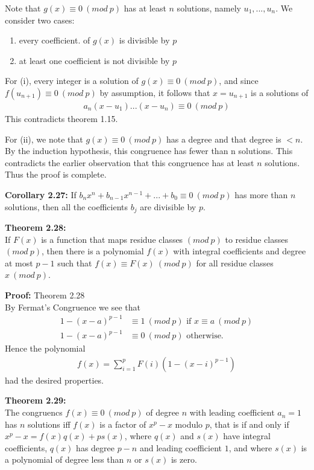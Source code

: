 \documentclass[a4paper]{article}
\begin{document}
Note that $g(x)\equiv 0\ (mod\ p)$ has at least $n$ solutions, namely $u_1,...,u_n$. We consider two cases:

\renewcommand{\theenumi}{\roman{enumi}}
\begin{enumerate}
    \item every coefficient. of $g(x)$ is divisible by $p$
    \item at least one coefficient is not divisible by $p$
\end{enumerate}

For (i), every integer is a solution of $g(x)\equiv 0\ (mod\ p)$, and since $f(u_{n+1})\equiv 0\ (mod\ p)$ by assumption, it follows that $x=u_{n+1}$ is a solutions of
\begin{align}
    a_n(x-u_1)...(x-u_n)\equiv 0\ (mod\ p)
\end{align}
This contradicts theorem 1.15.

For (ii), we note that $g(x)\equiv 0\ (mod\ p)$ has a degree and that degree is $<n$. By the induction hypothesis, this congruence has fewer than n solutions. This contradicts the earlier observation that this congruence has at least $n$ solutions. Thus the proof is complete.

\textbf{Corollary 2.27:}
If $b_nx^n+b_{n-1}x^{n-1}+...+b_0\equiv 0\ (mod\ p)$ has more than $n$ solutions, then all the coefficients $b_j$ are divisible by $p$.

\textbf{Theorem 2.28:}\\
If $F(x)$ is a function that maps residue classes $(mod\ p)$ to residue classes $(mod\ p)$, then there is a polynomial $f(x)$ with integral coefficients and degree at most $p-1$ such that $f(x)\equiv F(x)\ (mod\ p)$ for all residue classes $x\ (mod\ p)$.

\textbf{Proof:} Theorem 2.28\\
By Fermat's Congruence we see that
\begin{align}
    1-(x-a)^{p-1}&\equiv 1\ (mod\ p)\text{ if } x\equiv a\ (mod\ p)\\
    1-(x-a)^{p-1}&\equiv 0\ (mod\ p) \text{ otherwise.}
\end{align}
Hence the polynomial
\begin{align}
    f(x)=\sum^p_{i=1}F(i)(1-(x-i)^{p-1})
\end{align}
had the desired properties.

\textbf{Theorem 2.29:}\\
The congruencs $f(x)\equiv 0\ (mod\ p)$ of degree $n$ with leading coefficient $a_n=1$ has $n$ solutions iff $f(x)$ is a factor of $x^p-x$ modulo $p$, that is if and only if $x^p-x=f(x)q(x)+ps(x)$, where $q(x)$ and $s(x)$ have integral coefficients, $q(x)$ has degree $p-n$ and leading coefficient $1$, and where $s(x)$ is a polynomial of degree less than $n$ or $s(x)$ is zero.
\end{document}
